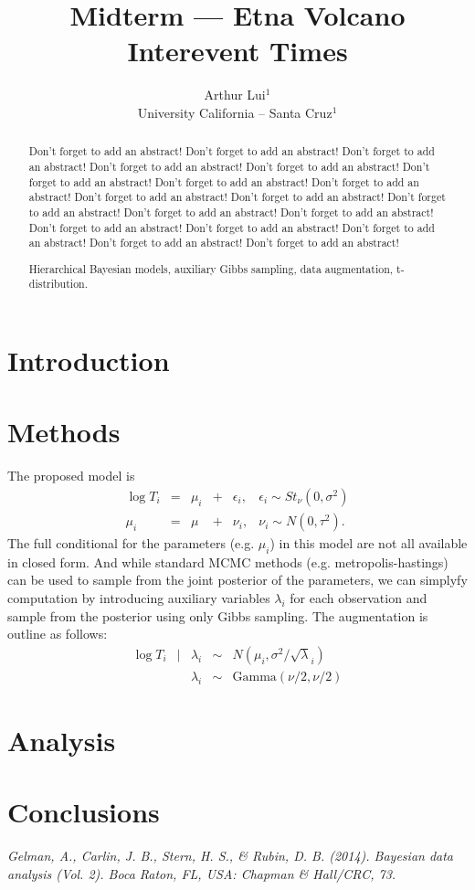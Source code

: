 \documentclass{../../tex_template/asaproc}
\title{Midterm --- Etna Volcano Interevent Times}
\author{
  Arthur Lui$^1$\\
  University California -- Santa Cruz$^1$\\
}
\begin{document}
\maketitle
\begin{abstract}
Don't forget to add an abstract!  Don't forget to add an abstract!  Don't forget to add an abstract!
Don't forget to add an abstract!  Don't forget to add an abstract!  Don't forget to add an abstract!
Don't forget to add an abstract!  Don't forget to add an abstract!  Don't forget to add an abstract!
Don't forget to add an abstract!  Don't forget to add an abstract!  Don't forget to add an abstract!
Don't forget to add an abstract!  Don't forget to add an abstract!  Don't forget to add an abstract!
Don't forget to add an abstract!  Don't forget to add an abstract!  Don't forget to add an abstract!
\begin{keywords}
Hierarchical Bayesian models, auxiliary Gibbs sampling, data augmentation, t-distribution.
\end{keywords}
\end{abstract}

\section{Introduction}

\section{Methods}
The proposed model is
$$
\begin{array}{rclclc}
  \log T_i &=& \mu_i &+&\epsilon_i, & \epsilon_i \sim St_\nu(0,\sigma^2)\\
  \mu_i &=& \mu &+& \nu_i, & \nu_i \sim N(0,\tau^2).
\end{array}
$$
The full conditional for the parameters (e.g. $\mu_i$) in this model are not all
available in closed form. And while standard MCMC methods (e.g.
metropolis-hastings) can be used to sample from the joint posterior of the
parameters, we can simplyfy computation by introducing auxiliary variables
$\lambda_i$ for each observation and sample from the posterior using only Gibbs
sampling. The augmentation is outline as follows:
$$
\begin{array}{rclcl}
  \log T_i &|& \lambda_i &\sim& N(\mu_i,\sigma^2 / \sqrt\lambda_i) \\
           & & \lambda_i &\sim& \text{Gamma}(\nu/2,\nu/2)
\end{array}
$$
\section{Analysis}
\section{Conclusions}

\begin{references}
{\footnotesize
\itemsep=3pt

\item {\em Gelman, A., Carlin, J. B., Stern, H. S., \& Rubin, D. B. (2014). Bayesian data analysis (Vol. 2). Boca Raton, FL, USA: Chapman \& Hall/CRC, 73.}

}
\end{references}
\end{document}

